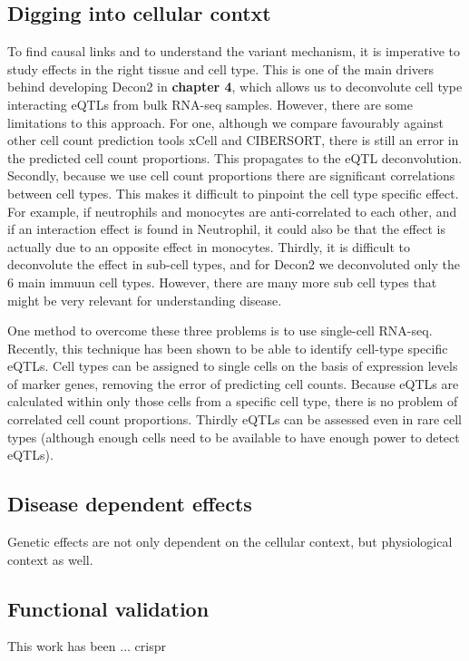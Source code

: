 \subsection{Digging into cellular contxt}
To find causal links and to understand the variant mechanism, it is imperative to study effects in the right tissue and cell type. This is one of the main drivers behind developing Decon2 in \textbf{chapter 4}, which allows us to deconvolute cell type interacting eQTLs from bulk RNA-seq samples. However, there are some limitations to this approach. For one, although we compare favourably against other cell count prediction tools xCell\cite{aranXCellDigitallyPortraying2017} and CIBERSORT\cite{newmanRobustEnumerationCell2015}, there is still an error in the predicted cell count proportions. This propagates to the eQTL deconvolution. Secondly, because we use cell count proportions there are significant correlations between cell types. This makes it difficult to pinpoint the cell type specific effect. For example, if neutrophils and monocytes are anti-correlated to each other, and if an interaction effect is found in Neutrophil, it could also be that the effect is actually due to an opposite effect in monocytes. Thirdly, it is difficult to deconvolute the effect in sub-cell types, and for Decon2 we deconvoluted only the 6 main immuun cell types. However, there are many more sub cell types that might be very relevant for understanding disease.

One method to overcome these three problems is to use single-cell RNA-seq\cite{tangMRNASeqWholetranscriptomeAnalysis2009}. Recently, this technique has been shown to be able to identify cell-type specific eQTLs\cite{vanderwijstSinglecellRNASequencing2018b}. Cell types can be assigned to single cells on the basis of expression levels of marker genes, removing the error of predicting cell counts. Because eQTLs are calculated within only those cells from a specific cell type, there is no problem of correlated cell count proportions. Thirdly eQTLs can be assessed even in rare cell types (although enough cells need to be available to have enough power to detect eQTLs).

\subsection{Disease dependent effects}
Genetic effects are not only dependent on the cellular context, but physiological context as well. 

\subsection{Functional validation}
This work has been ... crispr

